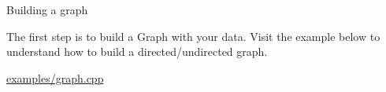 Building a graph

The first step is to build a Graph with your data. Visit the example below to understand how to build a directed/undirected graph.

\hyperlink{examples_2graph_8cpp-example}{examples/graph.\+cpp} 
